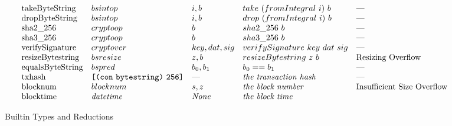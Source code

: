 \documentclass[../main.tex]{subfiles}
\begin{document}
\begin{figure*}[t]
\[\begin{array}{lllll}
        \mathrm{takeByteString}    &   bsintop   &   i, b     & take ~ (fromIntegral ~ i) ~ b   &   \textrm{---} \\
        \mathrm{dropByteString}    &   bsintop   &   i, b     & drop ~ (fromIntegral ~ i) ~ b   &   \textrm{---} \\
        
        \mathrm{sha2\_256}         &  cryptoop  &   b           & sha2\_256 ~ b    & \textrm{---}                \\
        \mathrm{sha3\_256}         &  cryptoop  &   b           & sha3\_256~ b     & \textrm{---}                \\
        
        \mathrm{verifySignature}   &  cryptover  &   key, dat, sig           & verifySignature ~ key ~ dat ~ sig   &   \textrm{---}          \\
        
        \mathrm{resizeBytestring}   &   bsresize   &   z, b   &   resizeBytestring ~ z ~ b   &   \textrm{Resizing Overflow} \\
        
        \mathrm{equalsByteString}  &   bspred   &   b_0 , b_1   & b_0 == b_1   &   \textrm{---}  \\
        
        \mathrm{txhash}   &   \texttt{[} \texttt{(} \texttt{con} ~ \texttt{bytestring} \texttt{)} ~ \texttt{256} \texttt{]}   &   \textrm{---}  & \textit{the transaction hash}   &   \textrm{---}  \\
        
        \mathrm{blocknum}  &  blocknum  & s, z & \textit{the block number}   &   \textrm{Insufficient Size Overflow}  \\
        
        \mathrm{blocktime} &  \mathit{datetime}  &  \textit{None}  & \textit{the block time}   &   \textrm{}  \\
    \end{array}\]
    
    \caption{Builtin Types and Reductions}
    \label{fig:Plutus_core_builtins}
\end{figure*}

\normalsize
\end{document}
